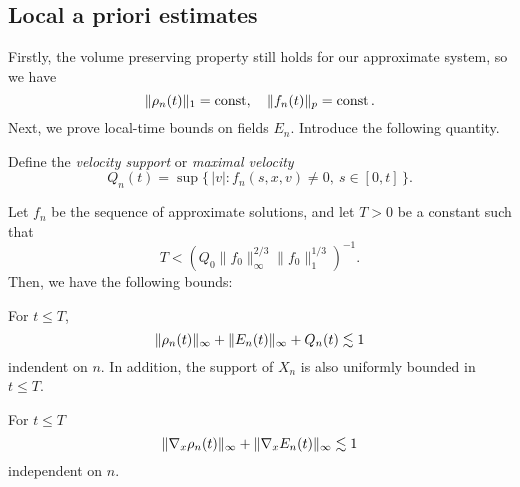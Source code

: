 \documentclass[11pt]{amsart}
\begin{document}
\subsection{Local a priori estimates}
Firstly, the volume preserving property still holds for our approximate system, so we have
\[\|\rho_n(t)\|_1=\operatorname{const},\quad\|f_n(t)\|_p=\operatorname{const}.\]
Next, we prove local-time bounds on fields $E_n$.
Introduce the following quantity.
\begin{defn}
Define the \emph{velocity support} or \emph{maximal velocity}
\[Q_n(t)=\sup\{\,|v|:f_n(s,x,v)\ne0,\ s\in[0,t]\,\}.\]
\end{defn}

\begin{lem}
Let $f_n$ be the sequence of approximate solutions, and let $T>0$ be a constant such that
\[T<(Q_0\|f_0\|_\infty^{2/3}\|f_0\|_1^{1/3})^{-1}.\]
Then, we have the following bounds:
\begin{cond}
\item
For $t\le T$,
\[\|\rho_n(t)\|_\infty+\|E_n(t)\|_\infty+Q_n(t)\lesssim1\]
indendent on $n$.
In addition, the support of $X_n$ is also uniformly bounded in $t\le T$.
\item
For $t\le T$
\[\|\nabla_x\rho_n(t)\|_\infty+\|\nabla_xE_n(t)\|_\infty\lesssim1\]
independent on $n$.
\end{cond}
\end{lem}
\end{document}
